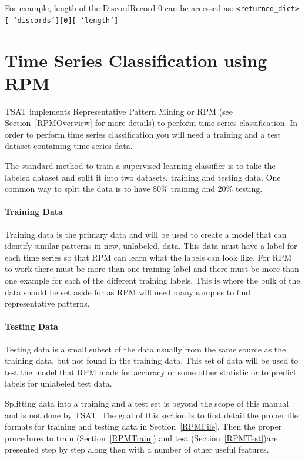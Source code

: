 \documentclass[titlepage, letterpaper, 12pt]{article}
\def\bsq#1{%
	\lq{#1}\rq}
\begin{document}
For example, length of the DiscordRecord 0 can be accessed as:
\texttt{<returned\_dict>[\bsq{discords}][0][\bsq{length}]}


\section{Time Series Classification using RPM}
\label{ClassGuide}
TSAT implements Representative Pattern Mining or RPM  (see Section~\ref{RPMOverview} for more details) to perform time series classification.  In order to perform time series classification you will need a training and a test dataset containing time series data.

The standard method to train a supervised learning classifier is to take the labeled dataset and split it into two datasets, training and testing data.  One common way to split the data is to have 80\% training and 20\% testing.  

\paragraph{Training Data}
Training data is the primary data and will be used to create a model that can identify similar patterns in new, unlabeled, data. This data must have a label for each time series so that RPM can learn what the labels can look like.  For RPM to work there must be more than one training label and there must be more than one example for each of the different training labels. This is where the bulk of the data should be set aside for as RPM will need many samples to find representative patterns.

\paragraph{Testing Data}
Testing data is a small subset of the data usually from the same source as the training data, but not found in the training data. This set of data will be used to test the model that RPM made for accuracy or some other statistic or to predict labels for unlabeled test data.

Splitting data into a training and a test set is beyond the scope of this manual and is not done by TSAT. The goal of this section is to first detail the proper file formats for training and testing data in Section~\ref{RPMFile}. Then the proper procedures to train (Section~\ref{RPMTrain}) and test (Section~\ref{RPMTest})are presented step by step along then with a number of other useful features. 
\end{document}

